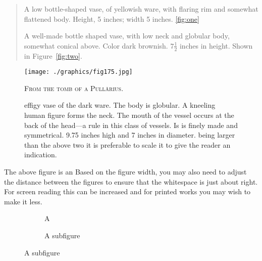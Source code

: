 \begin{quote}
 A low bottle-shaped vase, of yellowish ware, with flaring rim and somewhat flattened body. Height, 5 inches; width 5 inches. \ref{fig:one}


A well-made bottle shaped vase, with low neck and globular body, somewhat conical above. Color dark brownish. $7\frac{1}{2}$ inches in height. Shown in Figure~\ref{fig:two}.
\end{quote}

\begin{figure}[htp]
  \centering
  \texttt{[image: ./graphics/fig175.jpg]}
  \vspace{3\baselineskip}

   \centerline{\textsc{From the tomb of a Pull\= arius.}}
  \label{fig:marginfig1}
  \caption{ effigy vase of the dark ware. The body is globular. A kneeling human figure forms the neck. The mouth of the vessel occurs at the back of the head—a rule in this class of vessels. Is is finely made and symmetrical. 9.75 inches high and 7 inches in diameter. being larger than the above two it is preferable to scale it to give the reader an indication.}
\end{figure}

The above figure is an Based on the figure width, you may also need to adjust the distance between the figures to ensure that the whitespace is just about right. For screen reading this can be increased and for printed works you may wish to make it less.

\begin{teXXX}
\begin{figure}[htb]
\begin{subfigure}[b]{.5\linewidth}
\centering\large A
\captionsetup{skip=3pt}
\caption{A subfigure}\label{fig:1a}
\end{subfigure}
\end{figure}
\end{teXXX}

\begin{comment}
\begin{figure}[htp]%
    \captionsetup[figure]{margin=3pt}%
    \subfloat[One subone.\label{fig:one}]
     {{\texttt{[image: ./graphics/fig155.jpg]}}}
    \hspace{1cm}
    \subfloat[One subtwo.\label{fig:two} --- but this one has a
     very very long caption.  So long that it continues over into
     other lines so that we can test the list-of line settings.]%
      {\texttt{[image: ./graphics/fig156.jpg]}}
     \\[-10pt]
    \caption{First figure --- but this one has a very very long caption.
     So long that it continues over into a second line so that we can
     test the margin setting and centering of the caption command in the
     full page mode.}%
    \label{fig:Afirst}%
    \caption{Typical pottery from Oklahoma (\emph{Smithsonian}).}%
    \label{fig:Athird}%
\end{figure}
\end{comment}

